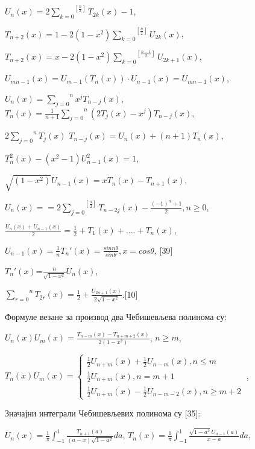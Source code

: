 \(U_{n}(x) = 2\overset{\left\lbrack \frac{n}{2} \right\rbrack}{\sum_{k = 0}}T_{2k}(x) - 1\),

\(T_{n + 2}(x) = 1 - 2(1 - x^{2})\overset{\left\lbrack \frac{n}{2} \right\rbrack}{\sum_{k = 0}}U_{2k}(x)\),

\(T_{n + 2}(x) = x - 2(1 - x^{2})\overset{\left\lbrack \frac{n - 1}{2} \right\rbrack}{\sum_{k = 0}}U_{2k + 1}(x)\),

\(U_{mn - 1}(x) = U_{m - 1}(T_{n}(x)) \cdot U_{n - 1}(x) = U_{mn - 1}(x)\),

\(U_{n}(x) = \overset{n}{\sum_{j = 0}}x^{j}T_{n - j}(x)\),
\(T_{n}(x) = \frac{1}{n + 1}\overset{n}{\sum_{j = 0}}(2T_{j}(x) - x^{j})T_{n - j}(x)\),

\(2\overset{n}{\sum_{j = 0}}T_{j}(x)\)
\(T_{n - j}(x) = U_{n}(x) + (n + 1)T_{n}(x)\),

\(T_{n}^{2}(x) - (x^{2} - 1)U_{n - 1}^{2}(x) = 1\),

\(\sqrt{(1 - x^{2})}U_{n - 1}(x) = xT_{n}(x) - T_{n + 1}(x)\),

\(U_{n}(x) = = 2\overset{\left\lbrack \frac{n}{2} \right\rbrack}{\sum_{j = 0}}T_{n - 2j}(x) - \frac{{( - 1)}^{n} + 1}{2},n \geq 0\),

\(\frac{U_{n}(x) + U_{n - 1}(x)}{2} = \frac{1}{2} + T_{1}(x) + .... + T_{n}(x)\),

\(U_{n - 1}(x) = \frac{1}{n}T_{n}'(x) = \frac{sinn\theta}{sin\theta},x = cos\theta\),
{[}39{]}

\(T_{n}'(x)\)=\(\frac{n}{\sqrt{1 - x^{2}}}U_{n}(x)\),

\(\overset{n}{\sum_{r = 0}}T_{2r}(x) = \frac{1}{2} + \frac{U_{2n + 1}(x)}{2\sqrt{1 - x^{2}}}\).{[}10{]}

Формуле везане за производ два Чебишевљева полинома су:

\(U_{n}(x)U_{m}(x) = \frac{T_{n - m}(x) - T_{n + m + 2}(x)}{2(1 - x^{2})}\),
\(n \geq m\),

\(T_{n}(x)U_{m}(x) = \left\{ \begin{array}{r}
\frac{1}{2}U_{n + m}\overset{}{(x)} + \frac{1}{2}U_{n - m}\overset{}{(x)},n \leq m \\
\frac{1}{2}U_{n + m}\overset{}{(x)},n = m + 1 \\
\frac{1}{2}U_{n + m}\overset{}{(x)} - \frac{1}{2}U_{n - m - 2}\overset{}{(x)},n \geq m + 2
\end{array} \right.\ \),

Значајни интеграли Чебишевљевих полинома су {[}35{]}:

\(U_{n}(x) = \frac{1}{\pi}\int_{- 1}^{1}\frac{T_{n + 1}\overset{}{(a)}}{(a - x)\sqrt{1 - a^{2}}}da\),
\(T_{n}(x) = \frac{1}{\pi}\int_{- 1}^{1}\frac{\sqrt{1 - a^{2}}U_{n - 1}\overset{}{(a)}}{x - a}da\),


